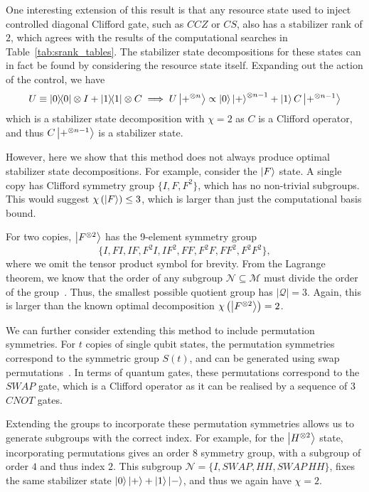 One interesting extension of this result is that any resource state used to inject controlled diagonal Clifford gate, such as $CCZ$ or $CS$, also has a stabilizer rank of $2$, which agrees with the results of the computational searches in Table~\ref{tab:srank_tables}. The stabilizer state decompositions for these states can in fact be found by considering the resource state itself. Expanding out the action of the control, we have
\begin{equation}
U\equiv \ketbra{0}\otimes I+\ketbra{1}\otimes C \implies U\ket{+^{\otimes n}}\propto \ket{0}\ket{+}^{\otimes n-1}+\ket{1}C\ket{+^{\otimes n-1}}
\end{equation}
which is a stabilizer state decomposition with $\chi=2$ as $C$ is a Clifford operator, and thus $C\ket{+^{\otimes n-1}}$ is a stabilizer state.\par
However, here we show that this method does not always produce optimal stabilizer state decompositions. For example, consider the $\ket{F}$ state. A single copy has Clifford symmetry group $\{I, F, F^{2}\}$, which has no non-trivial subgroups. This would suggest $\chi\left(\ket{F}\right)\leq 3$, which is larger than just the computational basis bound.\par
For two copies, $\ket{F^{\otimes 2}}$ has the 9-element symmetry group
\begin{equation}
\{I,FI, IF, F^{2}I, IF^{2}, FF, F^{2}F, FF^{2}, F^{2}F^{2}\},
\label{eq:f2_symmetry_group}
\end{equation} where we omit the tensor product symbol for brevity. From the Lagrange theorem, we know that the order of any subgroup $\mathcal{N}\subseteq\mathcal{M}$ must divide the order of the group~\cite{Artin2010}. Thus, the smallest possible quotient group has $\left|\mathcal{Q}\right|=3$. Again, this is larger than the known optimal decomposition $\chi\left(\ket{F^{\otimes 2}}\right)=2$.\par
We can further consider extending this method to include permutation symmetries. For $t$ copies of single qubit states, the permutation symmetries correspond to the symmetric group $S(t)$, and can be generated using swap permutations~\cite{Artin2010}. In terms of quantum gates, these permutations correspond to the $SWAP$ gate, which is a Clifford operator as it can be realised by a sequence of $3$ $CNOT$ gates.\par
Extending the groups to incorporate these permutation symmetries allows us to generate subgroups with the correct index. For example, for the $\ket{H^{\otimes 2}}$ state, incorporating permutations gives an order $8$ symmetry group, with a subgroup of order $4$ and thus index $2$. This subgroup $\mathcal{N}=\{I, SWAP, HH, SWAP\,HH\}$, fixes the same stabilizer state $\ket{0}\ket{+}+\ket{1}\ket{-}$, and thus we again have $\chi=2$.\par
